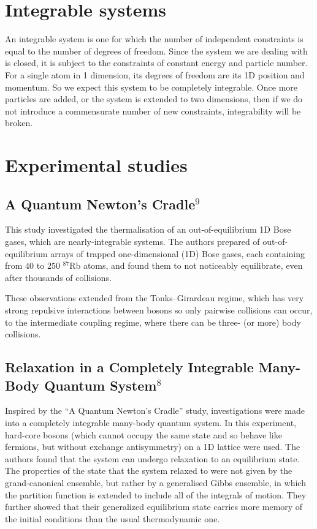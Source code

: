 \documentclass[a4paper,10pt]{article}
\begin{document}
\section{Integrable systems}
An integrable system is one for which the number of independent constraints is equal to the number of degrees of freedom. Since the system we are dealing with
is closed, it is subject to the constraints of constant energy and particle number. For a single atom in 1 dimension, its degrees of freedom are its 1D position and momentum.
So we expect this system to be completely integrable. Once more particles are added, or the system is extended to two dimensions, then if we do not introduce a commensurate number
of new constraints, integrability will be broken.


\section{Experimental studies}
\subsection{A Quantum Newton's Cradle$^9$}

This study investigated the thermalisation of an out-of-equilibrium 1D Bose gases, which are nearly-integrable systems. The authors prepared
of out-of-equilibrium arrays of trapped one-dimensional (1D) Bose gases, each containing from $40$ to $250$ $^{87}$Rb atoms, and found them to not noticeably equilibrate,
even after thousands of collisions. 

These observations extended from the Tonks–Girardeau regime, which has very strong repulsive interactions between bosons so only pairwise collisions can occur, to the intermediate 
coupling regime, where there can be three- (or more) body collisions. 

\subsection{Relaxation in a Completely Integrable Many-Body Quantum System$^8$}

Inspired by the ``A Quantum Newton's Cradle'' study, investigations were made into a completely integrable many-body quantum system. In this experiment, hard-core bosons (which cannot
occupy the same state and so behave like fermions, but without exchange antisymmetry) on a 1D lattice were used. The authors found that the system can undergo relaxation to an equilibrium 
state. The properties of the state that the system relaxed to were not given by the grand-canonical ensemble, but rather by a generalised Gibbs ensemble, in which the partition function 
is extended to include all of the integrals of motion. They further showed that their generalized equilibrium state carries more memory of the initial conditions than the usual thermodynamic one.
\end{document}
